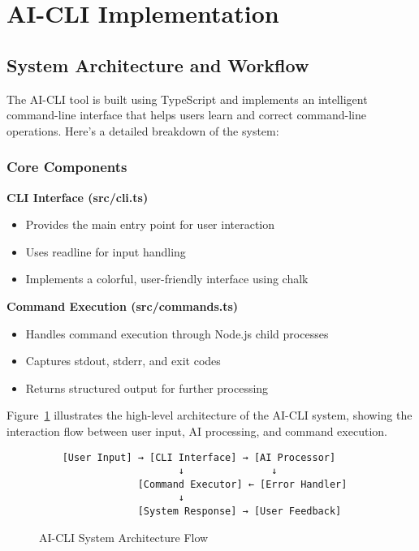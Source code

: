\section{AI-CLI Implementation}

\subsection{System Architecture and Workflow}

The AI-CLI tool is built using TypeScript and implements an intelligent command-line interface that helps users learn and correct command-line operations. Here's a detailed breakdown of the system:

\subsubsection{Core Components}

\textbf{CLI Interface (src/cli.ts)}
\begin{itemize}
	\item Provides the main entry point for user interaction
	\item Uses readline for input handling
	\item Implements a colorful, user-friendly interface using chalk
\end{itemize}

\textbf{Command Execution (src/commands.ts)}
\begin{itemize}
	\item Handles command execution through Node.js child processes
	\item Captures stdout, stderr, and exit codes
	\item Returns structured output for further processing
\end{itemize}

Figure~\ref{fig:system_architecture} illustrates the high-level architecture of the AI-CLI system, showing the interaction flow between user input, AI processing, and command execution.

\begin{figure}[h]
	\centering
	\begin{verbatim}
    [User Input] → [CLI Interface] → [AI Processor]
                        ↓               ↓
                 [Command Executor] ← [Error Handler]
                        ↓
                 [System Response] → [User Feedback]
	\end{verbatim}
	\caption{AI-CLI System Architecture Flow}
	\label{fig:system_architecture}
\end{figure}


